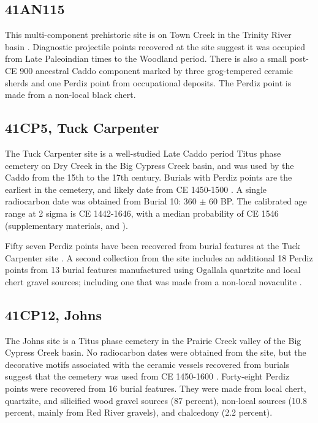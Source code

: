 \documentclass[review]{elsarticle}
\begin{document}
\subsection*{41AN115}

This multi-component prehistoric site is on Town Creek in the Trinity River basin \citep{RN8982}. Diagnostic projectile points recovered at the site suggest it was occupied from Late Paleoindian times to the Woodland period. There is also a small post-CE 900 ancestral Caddo component marked by three grog-tempered ceramic sherds and one Perdiz point from occupational deposits. The Perdiz point is made from a non-local black chert.

\subsection*{41CP5, Tuck Carpenter}

The Tuck Carpenter site is a well-studied Late Caddo period Titus phase cemetery on Dry Creek in the Big Cypress Creek basin, and was used by the Caddo from the 15th to the 17th century. Burials with Perdiz points are the earliest in the cemetery, and likely date from CE 1450-1500 \citep[197]{RN8962}. A single radiocarbon date was obtained from Burial 10: 360 $\pm$ 60 BP. The calibrated age range at 2 sigma is CE 1442-1646, with a median probability of CE 1546 (supplementary materials, and \citealp{RN8980}).

Fifty seven Perdiz points have been recovered from burial features at the Tuck Carpenter site \citep{RN8963,RN3158,RN3159}. A second collection from the site includes an additional 18 Perdiz points from 13 burial features manufactured using Ogallala quartzite and local chert gravel sources; including one that was made from a non-local novaculite \citep[Table 2]{RN8962}.

\subsection*{41CP12, Johns}

The Johns site is a Titus phase cemetery in the Prairie Creek valley of the Big Cypress Creek basin. No radiocarbon dates were obtained from the site, but the decorative motifs associated with the ceramic vessels recovered from burials suggest that the cemetery was used from CE 1450-1600 \citep{RN2440}. Forty-eight Perdiz points were recovered from 16 burial features. They were made from local chert, quartzite, and silicified wood gravel sources (87 percent), non-local sources (10.8 percent, mainly from Red River gravels), and chalcedony (2.2 percent).
\end{document}
